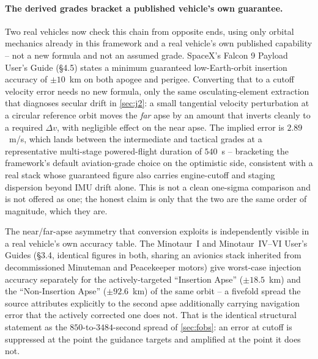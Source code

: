 \documentclass[11pt,a4paper]{article}
\theoremstyle{definition}
\numberwithin{equation}{section}
\begin{document}
\paragraph{The derived grades bracket a published vehicle's own guarantee.} Two real vehicles now check this chain from opposite ends, using only orbital mechanics already in this framework and a real vehicle's own published capability -- not a new formula and not an assumed grade. SpaceX's Falcon 9 Payload User's Guide \cite{spacex2009falcon9} (\S4.5) states a minimum guaranteed low-Earth-orbit insertion accuracy of $\pm 10$~km on both apogee and perigee. Converting that to a cutoff velocity error needs no new formula, only the same osculating-element extraction that diagnoses secular drift in \cref{sec:j2}: a small tangential velocity perturbation at a circular reference orbit moves the \emph{far} apse by an amount that inverts cleanly to a required $\Delta v$, with negligible effect on the near apse. The implied error is $2.89$~m/s, which lands between the intermediate and tactical grades at a representative multi-stage powered-flight duration of $540$~s -- bracketing the framework's default aviation-grade choice on the optimistic side, consistent with a real stack whose guaranteed figure also carries engine-cutoff and staging dispersion beyond IMU drift alone. This is not a clean one-sigma comparison and is not offered as one; the honest claim is only that the two are the same order of magnitude, which they are.

The near/far-apse asymmetry that conversion exploits is independently visible in a real vehicle's own accuracy table. The Minotaur~I and Minotaur~IV--VI User's Guides \cite{orbitalatk2020minotaur1} (\S3.4, identical figures in both, sharing an avionics stack inherited from decommissioned Minuteman and Peacekeeper motors) give worst-case injection accuracy separately for the actively-targeted ``Insertion Apse'' ($\pm 18.5$~km) and the ``Non-Insertion Apse'' ($\pm 92.6$~km) of the same orbit -- a fivefold spread the source attributes explicitly to the second apse additionally carrying navigation error that the actively corrected one does not. That is the identical structural statement as the $850$-to-$3484$-second spread of \cref{sec:fobs}: an error at cutoff is suppressed at the point the guidance targets and amplified at the point it does not.
\end{document}
